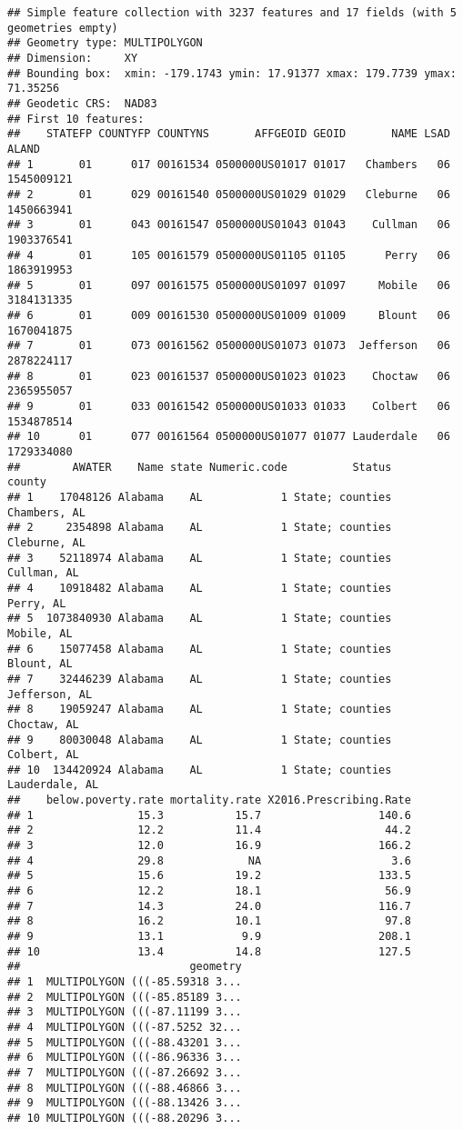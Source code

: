 \documentclass[
]{article}
\begin{document}
\begin{verbatim}
## Simple feature collection with 3237 features and 17 fields (with 5 geometries empty)
## Geometry type: MULTIPOLYGON
## Dimension:     XY
## Bounding box:  xmin: -179.1743 ymin: 17.91377 xmax: 179.7739 ymax: 71.35256
## Geodetic CRS:  NAD83
## First 10 features:
##    STATEFP COUNTYFP COUNTYNS       AFFGEOID GEOID       NAME LSAD      ALAND
## 1       01      017 00161534 0500000US01017 01017   Chambers   06 1545009121
## 2       01      029 00161540 0500000US01029 01029   Cleburne   06 1450663941
## 3       01      043 00161547 0500000US01043 01043    Cullman   06 1903376541
## 4       01      105 00161579 0500000US01105 01105      Perry   06 1863919953
## 5       01      097 00161575 0500000US01097 01097     Mobile   06 3184131335
## 6       01      009 00161530 0500000US01009 01009     Blount   06 1670041875
## 7       01      073 00161562 0500000US01073 01073  Jefferson   06 2878224117
## 8       01      023 00161537 0500000US01023 01023    Choctaw   06 2365955057
## 9       01      033 00161542 0500000US01033 01033    Colbert   06 1534878514
## 10      01      077 00161564 0500000US01077 01077 Lauderdale   06 1729334080
##        AWATER    Name state Numeric.code          Status         county
## 1    17048126 Alabama    AL            1 State; counties   Chambers, AL
## 2     2354898 Alabama    AL            1 State; counties   Cleburne, AL
## 3    52118974 Alabama    AL            1 State; counties    Cullman, AL
## 4    10918482 Alabama    AL            1 State; counties      Perry, AL
## 5  1073840930 Alabama    AL            1 State; counties     Mobile, AL
## 6    15077458 Alabama    AL            1 State; counties     Blount, AL
## 7    32446239 Alabama    AL            1 State; counties  Jefferson, AL
## 8    19059247 Alabama    AL            1 State; counties    Choctaw, AL
## 9    80030048 Alabama    AL            1 State; counties    Colbert, AL
## 10  134420924 Alabama    AL            1 State; counties Lauderdale, AL
##    below.poverty.rate mortality.rate X2016.Prescribing.Rate
## 1                15.3           15.7                  140.6
## 2                12.2           11.4                   44.2
## 3                12.0           16.9                  166.2
## 4                29.8             NA                    3.6
## 5                15.6           19.2                  133.5
## 6                12.2           18.1                   56.9
## 7                14.3           24.0                  116.7
## 8                16.2           10.1                   97.8
## 9                13.1            9.9                  208.1
## 10               13.4           14.8                  127.5
##                          geometry
## 1  MULTIPOLYGON (((-85.59318 3...
## 2  MULTIPOLYGON (((-85.85189 3...
## 3  MULTIPOLYGON (((-87.11199 3...
## 4  MULTIPOLYGON (((-87.5252 32...
## 5  MULTIPOLYGON (((-88.43201 3...
## 6  MULTIPOLYGON (((-86.96336 3...
## 7  MULTIPOLYGON (((-87.26692 3...
## 8  MULTIPOLYGON (((-88.46866 3...
## 9  MULTIPOLYGON (((-88.13426 3...
## 10 MULTIPOLYGON (((-88.20296 3...
\end{verbatim}
\end{document}
